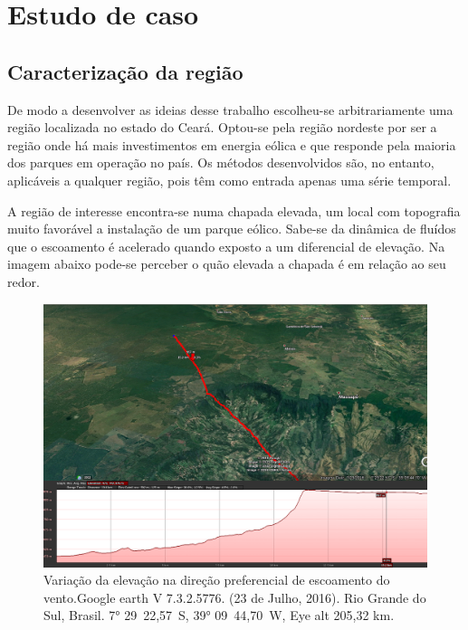 \documentclass[
	12pt,				%
	openright,			%
	oneside,			%
	a4paper,			%
	english,			%
	french,				%
	spanish,			%
	brazil				%
	]{abntex2}
\begin{document}
\cleardoublepage
\part{Estudo de caso}

\chapter{Caracterização da região}

De modo a desenvolver as ideias desse trabalho escolheu-se arbitrariamente uma região localizada no estado do Ceará. Optou-se pela região nordeste por ser a região onde há mais investimentos em energia eólica e que responde pela maioria dos parques em operação no país. Os métodos desenvolvidos são, no entanto, aplicáveis a qualquer região, pois têm como entrada apenas uma série temporal.

A região de interesse encontra-se numa chapada elevada, um local com topografia muito favorável a instalação de um parque eólico. Sabe-se da dinâmica de fluídos que o escoamento é acelerado quando exposto a um diferencial de elevação. Na imagem abaixo pode-se perceber o quão elevada a chapada é em relação ao seu redor.

\begin{figure}[h]
    \centering
	\includegraphics[width=\textwidth]{elevation2}
	\caption{Variação da elevação na direção preferencial de escoamento do vento.\newline Google earth V 7.3.2.5776. (23 de Julho, 2016). Rio Grande do Sul, Brasil. \ang{7} 29\textquotesingle\ 22,57\textquotesingle\textquotesingle\ S, \ang{39} 09\textquotesingle\ 44,70\textquotesingle\textquotesingle\ W, Eye alt 205,32 km.}
\end{figure}
\FloatBarrier
\end{document}

